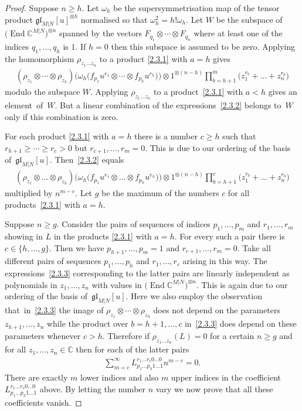 \documentclass[pdftex]{sigma}
\numberwithin{equation}{section}
\def\CC{{\mathbb{C}}}
\def\CMN{\CC^{M|N}}
\def\End{\operatorname{End}}
\def\g{\glMN [u]}
\def\ge{\geqslant}
\def\glMN{\mathfrak{gl}_{M|N}}
\def\om{\omega}
\def\ot{\otimes}
\begin{document}
\begin{proof}
Suppose $n\ge h $.
Let $\om_{h}$ be the supersymmetrisation map of
the tensor product $\glMN[u]^{\ot h}$ normalised so that
$\om_{h}^{2}=h ! \om_{h} $.
Let $W$ be the subspace
of $\big(\End\CMN\big)^{\ot n}$ spanned by the vectors
$F_{q_{1}}\ot\cdots\ot F_{q_{n}}$
where at least one
of the indices $q_{1},\dots, q_{h}$ is $1 $.
If $h=0$ then this subspace is assumed to be zero.
Applying the homomorphism
$\rho_{z_1\dots z_n}$ to a product \eqref{2.3.1}
with $a=h$ gives
\begin{gather}\label{2.3.2}
( \rho_{z_1}\ot\cdots\ot\rho_{z_{h}} )
\big( \om_{h}
\big( f_{p_1}u^{r_1}
\ot\cdots\ot
f_{p_{h}}u^{r_h} \big) \big)
\ot1^{\ot (n-h)}
\prod_{b=h+1}^m
\big( z_1^{r_b}+\dots+z_n^{r_b} \big)
\end{gather}
modulo the subspace $W$. Applying
$\rho_{z_1\dots z_n}$ to a product~\eqref{2.3.1}
with $a<h$ gives an element~of~$W$.
But a linear combination of the
expressions~\eqref{2.3.2} belongs to~$W$
only if this combination is zero.

For each product \eqref{2.3.1} with $a=h$
there is a number $c\ge h$ such that $r_{h+1}\ge\cdots\ge r_c>0$
but $r_{c+1} ,\dots, r_m=0 $.
This is due to our ordering of the basis of~$\g $.
Then~\eqref{2.3.2} equals
\begin{gather}\label{2.3.3}
( \rho_{z_1}\ot\dots\ot\rho_{z_{h}} )
\big( \om_{h}
\big( f_{p_1}u^{r_1}
\ot\dots\ot
f_{p_{h}}u^{r_h} \big) \big)
\ot1^{\ot (n-h)}
\prod_{b=h+1}^c
\big( z_1^{r_b}+\dots+z_n^{r_b} \big)
\end{gather}
multiplied by $n^{m-c}$.
Let $g$ be the maximum of the numbers $c$
for all products~\eqref{2.3.1} with $a=h $.

Suppose $n\ge g$. Consider the pairs of sequences of indices
$p_1,\dots, p_{m}$ and $r_1,\dots, r_m$
showing in $L$ in the products \eqref{2.3.1}
with $a=h$. For every such a pair there is
$c\in\{h,\dots, g \}$.
Then we have
$p_{h+1},\dots, p_{m}=1$ and $r_{c+1},\dots, r_m=0$.
Take all different pairs of sequences $p_1,\dots, p_{h}$ and $r_1,\dots, r_c$
arising in this way.
The expressions~\eqref{2.3.3} corresponding to the latter pairs
are linearly independent as polynomials in $z_1,\dots, z_n$
with values in $\big(\End\CMN\big)^{\ot n}$.
This is again due to our ordering of the basis of~$\g$.
Here we also employ the observation that~in~\eqref{2.3.3} the image of
$\rho_{z_1}\ot\cdots\ot\rho_{z_{h}}$
does not depend on the parameters $z_{h+1},\dots, z_n$
while the product over $b=h+1,\dots, c$ in~\eqref{2.3.3}
does depend on these parameters whenever $c>h$.
Therefore if $\rho_{z_1\ldots z_n}(L)=0$ for a certain $n\ge g$
and for all $z_1,\dots, z_n\in\CC$ then for each of the latter pairs
\begin{gather*}
\sum_{m=c}^\infty
L_{p_1\ldots p_h 1\ldots 1}^{r_1\ldots r_c 0\ldots 0} n^{m-c}=0.
\end{gather*}
There are exactly $m$ lower indices and also $m$ upper indices
in the coefficient
$L_{p_1\ldots p_h 1\ldots 1}^{r_1\ldots r_c 0\ldots 0}$ above.
By letting the number $n$ vary we now prove that all these
coefficients vanish.
\end{proof}
\end{document}
